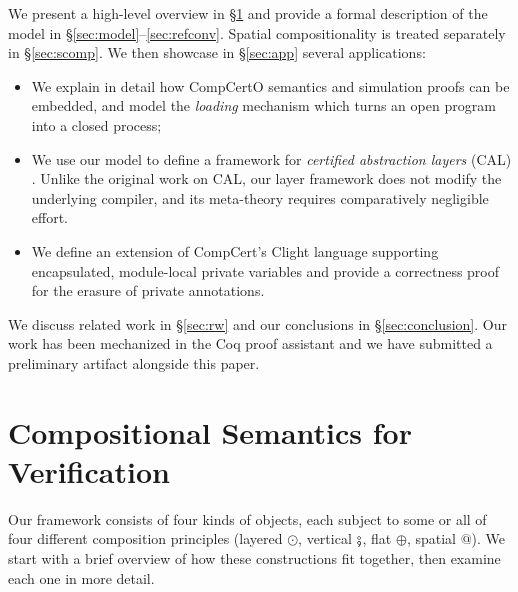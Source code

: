 \documentclass[acmsmall,screen,review,nonacm]{acmart}
\begin{document}
We present a high-level overview in \S\ref{sec:overview}
and provide a formal description of the model in \S\ref{sec:model}--\ref{sec:refconv}.
Spatial compositionality is treated separately in \S\ref{sec:scomp}.
We then showcase in \S\ref{sec:app} several applications:
\begin{itemize}
  \item We explain in detail how
    CompCertO semantics and simulation proofs can be embedded,
    and model the \emph{loading} mechanism
    which turns an open program into a closed process;
  \item We use our model to define a framework for
    \emph{certified abstraction layers} (CAL) \cite{popl15}.
    Unlike the original work on CAL,
    our layer framework does not modify the underlying compiler,
    and its meta-theory requires comparatively negligible effort.
  \item We define an extension of CompCert's Clight language
    supporting encapsulated, module-local private variables
    and provide a correctness proof for the erasure of private annotations.
\end{itemize}
We discuss related work in \S\ref{sec:rw}
and our conclusions in \S\ref{sec:conclusion}.
Our work has been mechanized in the Coq proof assistant
and we have submitted a preliminary artifact alongside this paper.



\section{Compositional Semantics for Verification} \label{sec:overview} %

Our framework consists of four kinds of objects,
each subject to some or all of four
different composition principles
(layered $\odot$,
 vertical $\fatsemi$,
 flat $\oplus$,
 spatial $\mathbin@$).
We start with a brief overview of how these constructions fit together,
then examine each one in more detail.
\end{document}
